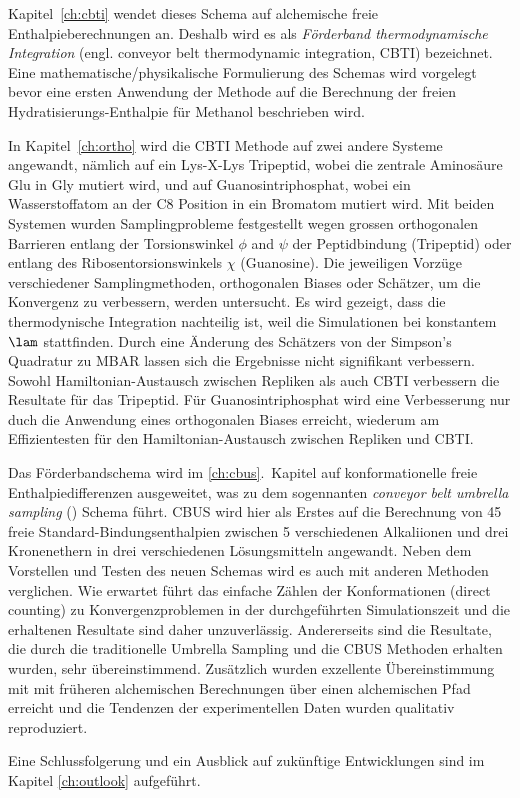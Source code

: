 Kapitel~\ref{ch:cbti} wendet dieses Schema auf alchemische freie Enthalpieberechnungen an.
Deshalb wird es als \textit{F\"orderband thermodynamische Integration} (engl. conveyor belt thermodynamic integration, CBTI) bezeichnet. Eine
mathematische/physikalische Formulierung des Schemas wird vorgelegt bevor eine ersten Anwendung der Methode auf die Berechnung der freien Hydratisierungs-Enthalpie
f\"ur Methanol beschrieben wird.

In Kapitel~\ref{ch:ortho} wird die CBTI Methode auf zwei andere Systeme angewandt, 
n\"amlich auf ein Lys-X-Lys Tripeptid,
wobei die zentrale Aminos\"aure Glu in Gly mutiert wird, und auf 
Guanosintriphosphat, wobei ein Wasserstoffatom an der C8 Position in ein Bromatom 
mutiert wird.
%
Mit beiden Systemen wurden Samplingprobleme festgestellt wegen grossen
orthogonalen Barrieren entlang  der Torsionswinkel $\phi$ and $\psi$ der Peptidbindung (Tripeptid)
oder entlang des Ribosentorsionswinkels $\chi$ (Guanosine).
Die jeweiligen Vorz\"uge verschiedener Samplingmethoden, orthogonalen  Biases oder
Sch\"atzer, um die Konvergenz zu verbessern, werden untersucht.
%
Es wird gezeigt, dass die thermodynische Integration nachteilig ist,
weil die Simulationen bei konstantem $\lam$ stattfinden.
%
Durch eine \"Anderung des Sch\"atzers von der Simpson's Quadratur zu  MBAR 
lassen sich die Ergebnisse nicht signifikant verbessern.
%
Sowohl Hamiltonian-Austausch zwischen Repliken als auch CBTI verbessern die 
Resultate f\"ur das Tripeptid.
%
F\"ur Guanosintriphosphat wird eine Verbesserung nur duch die Anwendung
eines orthogonalen Biases erreicht, wiederum am Effizientesten f\"ur
den Hamiltonian-Austausch zwischen Repliken und CBTI.

Das F\"orderbandschema wird im \ref{ch:cbus}.~Kapitel auf konformationelle
freie Enthalpiedifferenzen ausgeweitet, was zu dem sogennanten
\textit{conveyor belt umbrella sampling} (\CBUS) Schema f\"uhrt.
%
CBUS wird hier als Erstes auf die Berechnung von 45 freie Standard-Bindungsenthalpien
zwischen 5 verschiedenen Alkaliionen und drei Kronenethern in drei verschiedenen
L\"osungsmitteln angewandt.
%
Neben dem Vorstellen und Testen des neuen Schemas wird es auch mit anderen Methoden
verglichen.
%
Wie erwartet f\"uhrt das einfache Z\"ahlen der Konformationen (direct counting)
zu Konvergenzproblemen in der
durchgef\"uhrten Simulationszeit und die erhaltenen Resultate sind daher
unzuverl\"assig.
%
Andererseits sind die Resultate, die durch die traditionelle Umbrella Sampling und 
die CBUS Methoden erhalten wurden, sehr \"ubereinstimmend.
%
Zus\"atzlich wurden exzellente \"Ubereinstimmung mit  mit fr\"uheren alchemischen 
Berechnungen \"uber einen alchemischen Pfad erreicht und die Tendenzen 
der experimentellen Daten wurden qualitativ reproduziert.

Eine Schlussfolgerung und ein Ausblick auf zuk\"unftige Entwicklungen sind
im Kapitel \ref{ch:outlook} aufgef\"uhrt.



